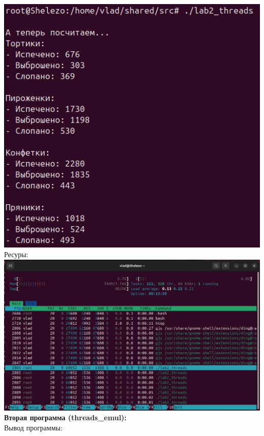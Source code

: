 \documentclass[a4paper,14pt]{extarticle}
\begin{document}
\includegraphics[width=140mm]{threads_output_2}\\
Ресуры:\\
\includegraphics[width=140mm]{threads_resources_2}\\
\textbf{Вторая программа (threads\_emul):}\\
Вывод программы:\\
\end{document}
